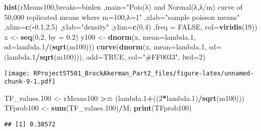 \documentclass[
]{article}
\newenvironment{Shaded}{\begin{snugshade}}{\end{snugshade}}
\newcommand{\DataTypeTok}[1]{\textcolor[rgb]{0.13,0.29,0.53}{#1}}
\newcommand{\DecValTok}[1]{\textcolor[rgb]{0.00,0.00,0.81}{#1}}
\newcommand{\FloatTok}[1]{\textcolor[rgb]{0.00,0.00,0.81}{#1}}
\newcommand{\KeywordTok}[1]{\textcolor[rgb]{0.13,0.29,0.53}{\textbf{#1}}}
\newcommand{\NormalTok}[1]{#1}
\newcommand{\OperatorTok}[1]{\textcolor[rgb]{0.81,0.36,0.00}{\textbf{#1}}}
\newcommand{\OtherTok}[1]{\textcolor[rgb]{0.56,0.35,0.01}{#1}}
\newcommand{\StringTok}[1]{\textcolor[rgb]{0.31,0.60,0.02}{#1}}
\begin{document}
\begin{Shaded}
\begin{Highlighting}[]
\KeywordTok{hist}\NormalTok{(rMeans100,}\DataTypeTok{breaks=}\NormalTok{binlen ,}\DataTypeTok{main=}\StringTok{"Pois(λ) and Normal(λ,λ/m) curve of 50,000 replicated means where m=100,λ=1"}\NormalTok{ ,}\DataTypeTok{xlab=}\StringTok{"sample poisson means"}\NormalTok{ ,}\DataTypeTok{xlim=}\KeywordTok{c}\NormalTok{(}\OperatorTok{-}\FloatTok{0.1}\NormalTok{,}\FloatTok{2.5}\NormalTok{) ,}\DataTypeTok{ylab=}\StringTok{"density"}\NormalTok{ ,}\DataTypeTok{ylim=}\KeywordTok{c}\NormalTok{(}\DecValTok{0}\NormalTok{,}\DecValTok{4}\NormalTok{) ,}\DataTypeTok{freq =} \OtherTok{FALSE}\NormalTok{, }\DataTypeTok{col=}\KeywordTok{viridis}\NormalTok{(}\DecValTok{19}\NormalTok{))}
\NormalTok{x <-}\StringTok{ }\KeywordTok{seq}\NormalTok{(}\DecValTok{0}\NormalTok{,}\DecValTok{2}\NormalTok{, }\DataTypeTok{by =} \FloatTok{0.2}\NormalTok{)}
\NormalTok{y100 <-}\StringTok{ }\KeywordTok{dnorm}\NormalTok{(x, }\DataTypeTok{mean=}\NormalTok{lambda}\FloatTok{.1}\NormalTok{, }\DataTypeTok{sd=}\NormalTok{lambda}\FloatTok{.1}\OperatorTok{/}\NormalTok{(}\KeywordTok{sqrt}\NormalTok{(m100)))}
\KeywordTok{curve}\NormalTok{(}\KeywordTok{dnorm}\NormalTok{(x, }\DataTypeTok{mean=}\NormalTok{lambda}\FloatTok{.1}\NormalTok{, }\DataTypeTok{sd=}\NormalTok{(lambda}\FloatTok{.1}\OperatorTok{/}\KeywordTok{sqrt}\NormalTok{(m100))), }\DataTypeTok{add=}\OtherTok{TRUE}\NormalTok{, }\DataTypeTok{col=}\StringTok{"#FF0033"}\NormalTok{, }\DataTypeTok{lwd=}\DecValTok{2}\NormalTok{)}
\end{Highlighting}
\end{Shaded}

\texttt{[image: RProjectST501\_BrockAkerman\_Part2\_files/figure-latex/unnamed-chunk-9-1.pdf]}

\begin{Shaded}
\begin{Highlighting}[]
\NormalTok{TF_values}\FloatTok{.100}\NormalTok{ <-}\StringTok{ }\NormalTok{rMeans100 }\OperatorTok{>=}\StringTok{ }\NormalTok{(lambda}\FloatTok{.1}\OperatorTok{+}\NormalTok{((}\DecValTok{2}\OperatorTok{*}\NormalTok{lambda}\FloatTok{.1}\NormalTok{)}\OperatorTok{/}\KeywordTok{sqrt}\NormalTok{(m100)))}
\NormalTok{TFprob100 <-}\StringTok{ }\KeywordTok{sum}\NormalTok{(TF_values}\FloatTok{.100}\NormalTok{)}\OperatorTok{/}\NormalTok{M; }\KeywordTok{print}\NormalTok{(TFprob100)}
\end{Highlighting}
\end{Shaded}

\begin{verbatim}
## [1] 0.38572
\end{verbatim}
\end{document}
